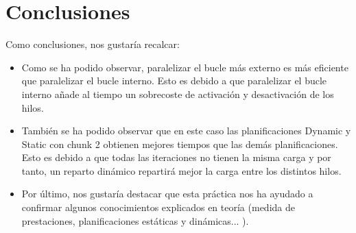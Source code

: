 \documentclass[11pt,oneside,a4paper]{article}
\begin{document}
\section{Conclusiones}
Como conclusiones, nos gustaría recalcar:
\begin{itemize}
\item 
Como se ha podido observar, paralelizar el bucle más externo es más eficiente que paralelizar el bucle interno. Esto es debido a que  paralelizar el bucle interno añade al tiempo un sobrecoste de activación y desactivación de los hilos. 
\item También se ha podido observar que en este caso las planificaciones Dynamic y Static con chunk 2 obtienen mejores tiempos que las demás planificaciones. Esto es debido  a que  todas las iteraciones no tienen la misma carga y por tanto, un reparto dinámico repartirá mejor la carga entre los distintos hilos.
\item Por último, nos gustaría destacar que esta práctica nos ha ayudado a confirmar algunos conocimientos explicados en teoría (medida  de prestaciones, planificaciones estáticas y dinámicas... ). 
\end{itemize}
\end{document}
